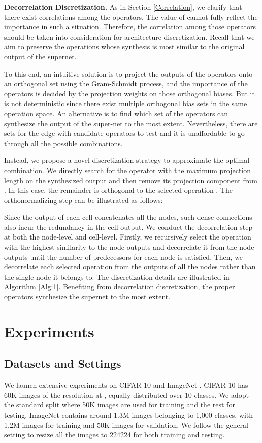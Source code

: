 \documentclass[journal]{IEEEtran}
\begin{document}
 
\textbf{Decorrelation Discretization.} As in Section \ref{Correlation}, we clarify that there exist correlations among the operators. The value of  cannot fully reflect the importance in such a situation. Therefore, the correlation among those operators should be taken into consideration for architecture discretization. Recall that we aim to preserve the operations whose synthesis is most similar to the original output of the supernet. 

To this end, an intuitive solution is to project the outputs of the operators onto an orthogonal set using the Gram-Schmidt process, and the importance of the operators is decided by the projection weights on those orthogonal biases. But it is not deterministic since there exist multiple orthogonal bias sets in the same operation space. An alternative is to find which set of the operators can synthesize the output of the super-net to the most extent. Nevertheless, there are  sets for the edge with  candidate operators to test and it is unaffordable to go through all the possible combinations. 

Instead, we propose a novel discretization strategy to approximate the optimal combination. We directly search for the operator  with the maximum projection length on the synthesized output  and then remove its projection component from . In this case, the remainder   is orthogonal to the selected operation . The orthonormalizing step can be illustrated as follows:

 


Since the output of each cell concatenates all the nodes, such dense connections also incur the redundancy in the cell output. We conduct the decorrelation step at both the node-level and cell-level. Firstly, we recursively select the operation with the highest similarity to the node outputs and decorrelate it from the node outputs until the number of predecessors for each node is satisfied. Then, we decorrelate each selected operation from the outputs of all the nodes rather than the single node it belongs to. The discretization details are illustrated in Algorithm \ref{Alg:1}. Benefiting from decorrelation discretization, the proper operators synthesize the supernet to the most extent. 





\section{Experiments}
\label{S.EXP}
\subsection{Datasets and Settings}
\label{S.exp.ds}
We launch extensive experiments on CIFAR-10  \cite{krizhevsky2009learning} and ImageNet \cite{DBLP:conf/cvpr/DengDSLL009}. CIFAR-10 has 60K images of the resolution at , equally distributed over 10 classes. We adopt the standard split where 50K images are used for training and the rest for testing. ImageNet contains around 1.3M images belonging to 1,000 classes, with 1.2M images for training and 50K images for validation. We follow the general setting to resize all the images to 224224 for both training and testing.
\end{document}
